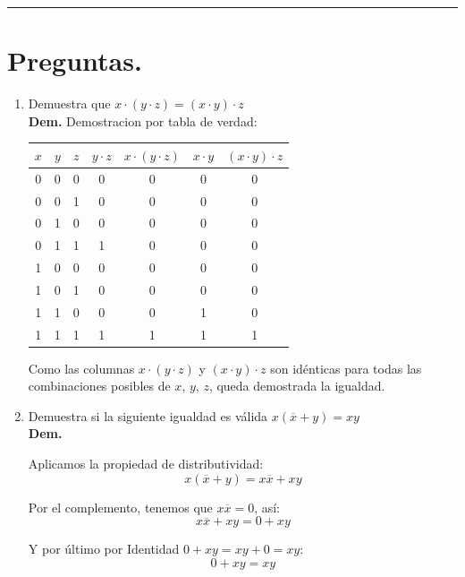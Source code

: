\documentclass[12pt,letterpaper]{article}
\begin{document}
\bigskip
\hrule height 0.1pt
\bigskip

\section*{Preguntas.}

\begin{enumerate}[label=\arabic*.]
\item Demuestra que $x \cdot (y \cdot z) = (x \cdot y) \cdot z$\\
  \textbf{Dem.} Demostracion por tabla de verdad:
  
  \begin{center}
    \begin{tabular}{| c | c | c | c | c | c | c |}
      \hline
      \textbf{$x$} & \textbf{$y$} & \textbf{$z$} & \textbf{$y \cdot z$} & \textbf{$x \cdot (y \cdot z)$} & \textbf{$x \cdot y$} & \textbf{$(x \cdot y) \cdot z$} \\
      \hline
      0 & 0 & 0 & 0 & 0 & 0 & 0 \\
      0 & 0 & 1 & 0 & 0 & 0 & 0 \\
      0 & 1 & 0 & 0 & 0 & 0 & 0 \\ 
      0 & 1 & 1 & 1 & 0 & 0 & 0 \\
      1 & 0 & 0 & 0 & 0 & 0 & 0 \\
      1 & 0 & 1 & 0 & 0 & 0 & 0 \\
      1 & 1 & 0 & 0 & 0 & 1 & 0 \\
      1 & 1 & 1 & 1 & 1 & 1 & 1 \\
      \hline
    \end{tabular}
  \end{center}

  Como las columnas $x \cdot (y \cdot z)$ y $(x \cdot y) \cdot z$ son idénticas para todas las combinaciones posibles de $x$, $y$, $z$, queda demostrada la igualdad.
  \bigskip
  
\item Demuestra si la siguiente igualdad es válida $x(\overline{x} + y) = xy$\\
  \textbf{Dem.}

  Aplicamos la propiedad de distributividad:
  \[
  x(\overline{x} + y) = x\overline{x} + xy
  \]

  Por el complemento, tenemos que $x\overline{x} = 0$, as\'{i}:
  \[
  x\overline{x} + xy = 0 + xy
  \]

  Y por \'{u}ltimo por Identidad $0 + xy = xy + 0 = xy$:
  \[
  0 + xy = xy
  \]


\end{enumerate}
\end{document}
